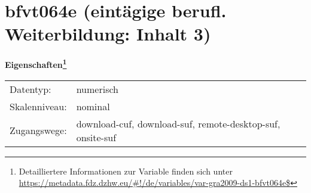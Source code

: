 
    \setcounter{footnote}{0}

    \vspace*{-1.8cm}
	\section{bfvt064e (eintägige berufl. Weiterbildung: Inhalt 3)}
	\label{section:bfvt064e}



    \vspace*{0.5cm}
    \noindent\textbf{Eigenschaften\footnote{Detailliertere Informationen zur Variable finden sich unter
		\url{https://metadata.fdz.dzhw.eu/\#!/de/variables/var-gra2009-ds1-bfvt064e$}}}\\
	\begin{tabularx}{\hsize}{@{}lX}
	Datentyp: & numerisch \\
	Skalenniveau: & nominal \\
	Zugangswege: &
	  download-cuf, 
	  download-suf, 
	  remote-desktop-suf, 
	  onsite-suf
 \\
    \end{tabularx}



